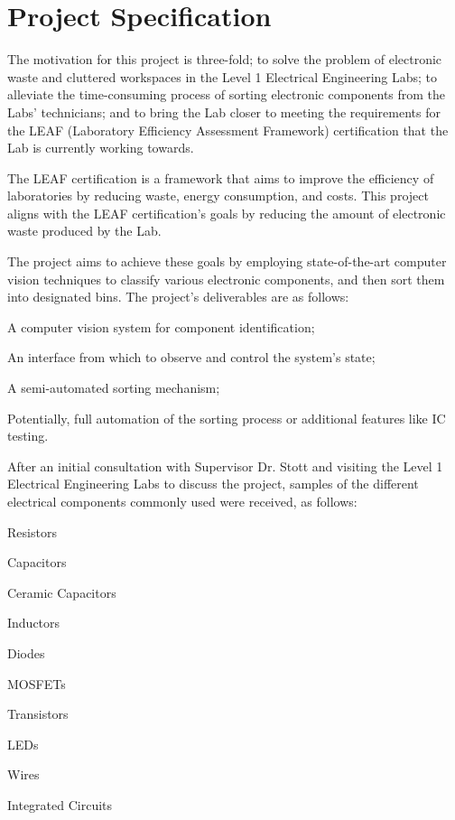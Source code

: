 \section{Project Specification}
\label{sec:project-specification}
The motivation for this project is three-fold; to solve the problem of electronic waste and cluttered workspaces in the Level 1 Electrical Engineering Labs;
to alleviate the time-consuming process of sorting electronic components from the Labs' technicians; and 
to bring the Lab closer to meeting the requirements for the LEAF (Laboratory Efficiency Assessment Framework) certification\cite{leaf} that
the Lab is currently working towards.

The LEAF certification is a framework that aims to improve the efficiency of laboratories by reducing waste, energy consumption, and costs.
This project aligns with the LEAF certification's goals by reducing the amount of electronic waste produced by the Lab.

The project aims to achieve these goals by employing state-of-the-art computer vision techniques to classify various electronic components,
and then sort them into designated bins. The project's deliverables are as follows:
\begin{mylist}
  \item A computer vision system for component identification;
  \item An interface from which to observe and control the system's state;
  \item A semi-automated sorting mechanism;
  \item Potentially, full automation of the sorting process or additional features like IC testing.
\end{mylist} 
\noindent
After an initial consultation with Supervisor Dr. Stott and visiting the Level 1 Electrical Engineering Labs to discuss the project,
samples of the different electrical components commonly used were received, as follows:
\begin{multicols}{2}
  \begin{mylist}
    \item Resistors
    \item Capacitors
    \item Ceramic Capacitors
    \item Inductors
    \item Diodes
    \item MOSFETs
    \item Transistors
    \item LEDs
    \item Wires
    \item Integrated Circuits
  \end{mylist}
\end{multicols}

